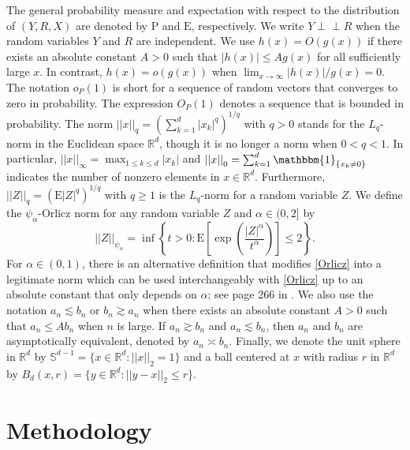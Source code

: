 \documentclass[ejsv2,noshowframe]{imsart}
\theoremstyle{plain}
\theoremstyle{definition}
\theoremstyle{remark}
\newcommand{\ind}{{\perp\!\!\!\perp}}
\newcommand{\norm}[1]{\left|\left| #1 \right|\right|}
\begin{document}
The general probability measure and expectation with respect to the distribution of $(Y,R,X)$ are denoted by $\mathrm{P}$ and $\mathrm{E}$, respectively. We write $Y\ind R$ when the random variables $Y$ and $R$ are independent. We use $h(x)=O(g(x))$ if there exists an absolute constant $A>0$ such that $|h(x)| \leq A g(x)$ for all sufficiently large $x$. In contrast, $h(x)=o(g(x))$ when $\lim_{x\to\infty} |h(x)|/g(x)=0$. The notation $o_P(1)$ is short for a sequence of random vectors that converges to zero in probability. The expression $O_P(1)$ denotes a sequence that is bounded in probability. 
The norm $\norm{x}_q = \left(\sum_{k=1}^d |x_k|^q\right)^{1/q}$ with $q>0$ stands for the $L_q$-norm in the Euclidean space $\mathbb{R}^d$, though it is no longer a norm when $0<q<1$. In particular, $\norm{x}_{\infty} = \max_{1\leq k \leq d} |x_k|$ and $\norm{x}_0=\sum_{k=1}^d \mathbbm{1}_{\{x_k\neq 0\}}$ indicates the number of nonzero elements in $x\in \mathbb{R}^d$. Furthermore, $\norm{Z}_q =\left(\mathrm{E}|Z|^q\right)^{1/q}$ with $q\geq 1$ is the $L_q$-norm for a random variable $Z$. We define the $\psi_{\alpha}$-Orlicz norm for any random variable $Z$ and $\alpha \in (0,2]$ by
\begin{equation}
	\label{Orlicz}
	\norm{Z}_{\psi_{\alpha}}=\inf\left\{t>0: \mathrm{E}\left[\exp\left(\frac{|Z|^{\alpha}}{t^{\alpha}} \right) \right] \leq 2 \right\}.
\end{equation} 
For $\alpha \in (0,1)$, there is an alternative definition that modifies \eqref{Orlicz} into a legitimate norm which can be used interchangeably with \eqref{Orlicz} up to an absolute constant that only depends on $\alpha$; see page 266 in \cite{van1996weak}. We also use the notation $a_n\lesssim b_n$ or $b_n\gtrsim a_n$ when there exists an absolute constant $A>0$ such that $a_n\leq A b_n$ when $n$ is large. If $a_n\gtrsim b_n$ and $a_n \lesssim b_n$, then $a_n$ and $b_n$ are asymptotically equivalent, denoted by $a_n\asymp b_n$. Finally, we denote the unit sphere in $\mathbb{R}^d$ by $\mathbb{S}^{d-1} = \{x\in \mathbb{R}^d: \norm{x}_2=1\}$ and a ball centered at $x$ with radius $r$ in $\mathbb{R}^d$ by $B_d(x,r)=\{y\in \mathbb{R}^d: \norm{y-x}_2\leq r\}$.


\section{Methodology}
\label{sec:Method}
\end{document}
